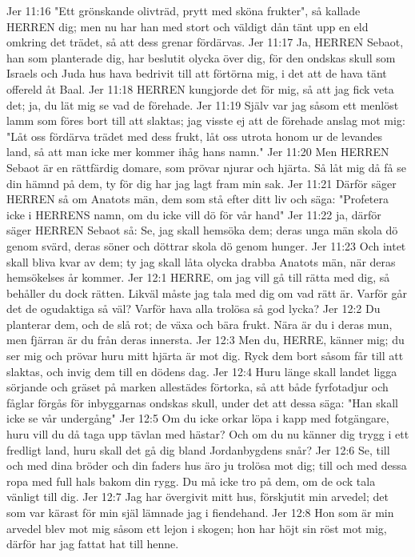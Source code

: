 Jer 11:16  "Ett grönskande olivträd, prytt med sköna frukter", så kallade HERREN dig; men nu har han med stort och väldigt dån tänt upp en eld omkring det trädet, så att dess grenar fördärvas.
Jer 11:17  Ja, HERREN Sebaot, han som planterade dig, har beslutit olycka över dig, för den ondskas skull som Israels och Juda hus hava bedrivit till att förtörna mig, i det att de hava tänt offereld åt Baal.
Jer 11:18  HERREN kungjorde det för mig, så att jag fick veta det; ja, du lät mig se vad de förehade.
Jer 11:19  Själv var jag såsom ett menlöst lamm som föres bort till att slaktas; jag visste ej att de förehade anslag mot mig: "Låt oss fördärva trädet med dess frukt, låt oss utrota honom ur de levandes land, så att man icke mer kommer ihåg hans namn."
Jer 11:20  Men HERREN Sebaot är en rättfärdig domare, som prövar njurar och hjärta. Så låt mig då få se din hämnd på dem, ty för dig har jag lagt fram min sak.
Jer 11:21  Därför säger HERREN så om Anatots män, dem som stå efter ditt liv och säga: "Profetera icke i HERRENS namn, om du icke vill dö för vår hand"
Jer 11:22  ja, därför säger HERREN Sebaot så: Se, jag skall hemsöka dem; deras unga män skola dö genom svärd, deras söner och döttrar skola dö genom hunger.
Jer 11:23  Och intet skall bliva kvar av dem; ty jag skall låta olycka drabba Anatots män, när deras hemsökelses år kommer.
Jer 12:1  HERRE, om jag vill gå till rätta med dig, så behåller du dock rätten. Likväl måste jag tala med dig om vad rätt är. Varför går det de ogudaktiga så väl? Varför hava alla trolösa så god lycka?
Jer 12:2  Du planterar dem, och de slå rot; de växa och bära frukt. Nära är du i deras mun, men fjärran är du från deras innersta.
Jer 12:3  Men du, HERRE, känner mig; du ser mig och prövar huru mitt hjärta är mot dig. Ryck dem bort såsom får till att slaktas, och invig dem till en dödens dag.
Jer 12:4  Huru länge skall landet ligga sörjande och gräset på marken allestädes förtorka, så att både fyrfotadjur och fåglar förgås för inbyggarnas ondskas skull, under det att dessa säga: "Han skall icke se vår undergång"
Jer 12:5  Om du icke orkar löpa i kapp med fotgängare, huru vill du då taga upp tävlan med hästar? Och om du nu känner dig trygg i ett fredligt land, huru skall det gå dig bland Jordanbygdens snår?
Jer 12:6  Se, till och med dina bröder och din faders hus äro ju trolösa mot dig; till och med dessa ropa med full hals bakom din rygg. Du må icke tro på dem, om de ock tala vänligt till dig.
Jer 12:7  Jag har övergivit mitt hus, förskjutit min arvedel; det som var kärast för min själ lämnade jag i fiendehand.
Jer 12:8  Hon som är min arvedel blev mot mig såsom ett lejon i skogen; hon har höjt sin röst mot mig, därför har jag fattat hat till henne.
